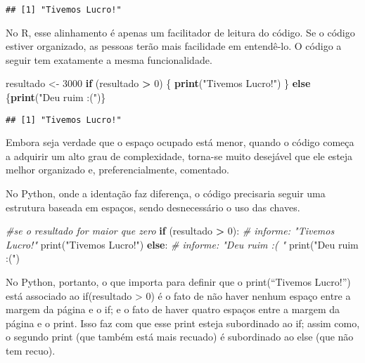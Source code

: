 \documentclass[
]{book}
\newenvironment{Shaded}{\begin{snugshade}}{\end{snugshade}}
\newcommand{\BuiltInTok}[1]{#1}
\newcommand{\CommentTok}[1]{\textcolor[rgb]{0.56,0.35,0.01}{\textit{#1}}}
\newcommand{\ControlFlowTok}[1]{\textcolor[rgb]{0.13,0.29,0.53}{\textbf{#1}}}
\newcommand{\DecValTok}[1]{\textcolor[rgb]{0.00,0.00,0.81}{#1}}
\newcommand{\KeywordTok}[1]{\textcolor[rgb]{0.13,0.29,0.53}{\textbf{#1}}}
\newcommand{\NormalTok}[1]{#1}
\newcommand{\OperatorTok}[1]{\textcolor[rgb]{0.81,0.36,0.00}{\textbf{#1}}}
\newcommand{\StringTok}[1]{\textcolor[rgb]{0.31,0.60,0.02}{#1}}
\begin{document}
\begin{verbatim}
## [1] "Tivemos Lucro!"
\end{verbatim}

No R, esse alinhamento é apenas um facilitador de leitura do código. Se o código estiver organizado, as pessoas terão mais facilidade em entendê-lo. O código a seguir tem exatamente a mesma funcionalidade.

\begin{Shaded}
\begin{Highlighting}[]
\NormalTok{resultado <-}\StringTok{ }\DecValTok{3000}
\ControlFlowTok{if}\NormalTok{ (resultado }\OperatorTok{>}\StringTok{ }\DecValTok{0}\NormalTok{) \{ }\KeywordTok{print}\NormalTok{(}\StringTok{"Tivemos Lucro!"}\NormalTok{) \} }\ControlFlowTok{else}\NormalTok{ \{}\KeywordTok{print}\NormalTok{(}\StringTok{"Deu ruim :("}\NormalTok{)\}}
\end{Highlighting}
\end{Shaded}

\begin{verbatim}
## [1] "Tivemos Lucro!"
\end{verbatim}

Embora seja verdade que o espaço ocupado está menor, quando o código começa a adquirir um alto grau de complexidade, torna-se muito desejável que ele esteja melhor organizado e, preferencialmente, comentado.

No Python, onde a identação faz diferença, o código precisaria seguir uma estrutura baseada em espaços, sendo desnecessário o uso das chaves.

\begin{Shaded}
\begin{Highlighting}[]
\CommentTok{#se o resultado for maior que zero}
\ControlFlowTok{if}\NormalTok{ (resultado }\OperatorTok{>} \DecValTok{0}\NormalTok{):  }
  \CommentTok{# informe: "Tivemos Lucro!"}
  \BuiltInTok{print}\NormalTok{(}\StringTok{"Tivemos Lucro!"}\NormalTok{) }
\ControlFlowTok{else}\NormalTok{:  }
  \CommentTok{# informe: "Deu ruim :( "}
  \BuiltInTok{print}\NormalTok{(}\StringTok{"Deu ruim :("}\NormalTok{) }
\end{Highlighting}
\end{Shaded}

No Python, portanto, o que importa para definir que o print(``Tivemos Lucro!'') está associado ao if(resultado \textgreater{} 0) é o fato de não haver nenhum espaço entre a margem da página e o if; e o fato de haver quatro espaços entre a margem da página e o print. Isso faz com que esse print esteja subordinado ao if; assim como, o segundo print (que também está mais recuado) é subordinado ao else (que não tem recuo).
\end{document}
